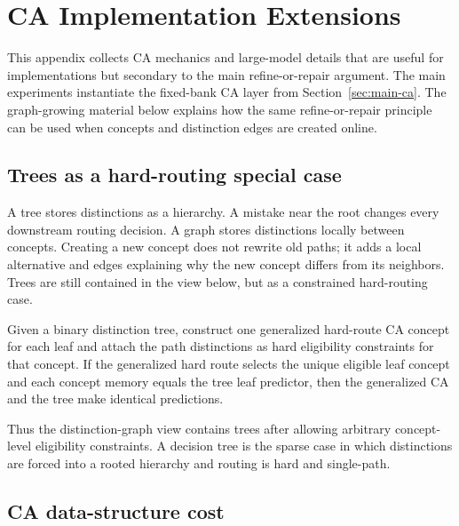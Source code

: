 \section{CA Implementation Extensions}
\label{app:dgm-extensions}

This appendix collects CA mechanics and large-model details that are useful for implementations but secondary to the main refine-or-repair argument. The main experiments instantiate the fixed-bank CA layer from Section~\ref{sec:main-ca}. The graph-growing material below explains how the same refine-or-repair principle can be used when concepts and distinction edges are created online.

\subsection{Trees as a hard-routing special case}

A tree stores distinctions as a hierarchy. A mistake near the root changes every downstream routing decision. A graph stores distinctions locally between concepts. Creating a new concept does not rewrite old paths; it adds a local alternative and edges explaining why the new concept differs from its neighbors. Trees are still contained in the view below, but as a constrained hard-routing case.

\begin{proposition}
\label{prop:tree-as-dgm:informal}
Given a binary distinction tree, construct one generalized hard-route CA concept for each leaf and attach the path distinctions as hard eligibility constraints for that concept. If the generalized hard route selects the unique eligible leaf concept and each concept memory equals the tree leaf predictor, then the generalized CA and the tree make identical predictions.
\end{proposition}

Thus the distinction-graph view contains trees after allowing arbitrary concept-level eligibility constraints. A decision tree is the sparse case in which distinctions are forced into a rooted hierarchy and routing is hard and single-path.

\subsection{CA data-structure cost}

